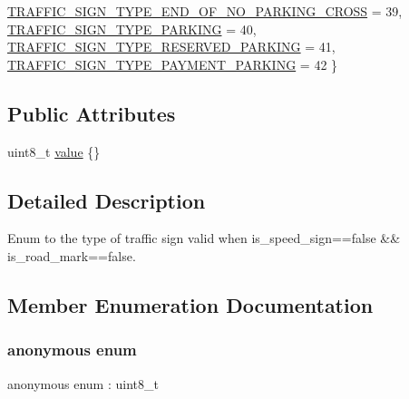 \begin{DoxyCompactItemize}
\hyperlink{structmaf__perception__interface_1_1TrafficSignTypeEnum_a8ee58c73d02876bd45300f1f742212bca35d2a4617d63066d45f0e8218b270acb}{T\+R\+A\+F\+F\+I\+C\+\_\+\+S\+I\+G\+N\+\_\+\+T\+Y\+P\+E\+\_\+\+E\+N\+D\+\_\+\+O\+F\+\_\+\+N\+O\+\_\+\+P\+A\+R\+K\+I\+N\+G\+\_\+\+C\+R\+O\+SS} = 39, 
\newline
\hyperlink{structmaf__perception__interface_1_1TrafficSignTypeEnum_a8ee58c73d02876bd45300f1f742212bca85eb2d49ec0f8629d5397db60e042f11}{T\+R\+A\+F\+F\+I\+C\+\_\+\+S\+I\+G\+N\+\_\+\+T\+Y\+P\+E\+\_\+\+P\+A\+R\+K\+I\+NG} = 40, 
\hyperlink{structmaf__perception__interface_1_1TrafficSignTypeEnum_a8ee58c73d02876bd45300f1f742212bcace675f566669e5d9c7bf0b78f60e82ae}{T\+R\+A\+F\+F\+I\+C\+\_\+\+S\+I\+G\+N\+\_\+\+T\+Y\+P\+E\+\_\+\+R\+E\+S\+E\+R\+V\+E\+D\+\_\+\+P\+A\+R\+K\+I\+NG} = 41, 
\hyperlink{structmaf__perception__interface_1_1TrafficSignTypeEnum_a8ee58c73d02876bd45300f1f742212bcafb0340ee1903f92349db315571019592}{T\+R\+A\+F\+F\+I\+C\+\_\+\+S\+I\+G\+N\+\_\+\+T\+Y\+P\+E\+\_\+\+P\+A\+Y\+M\+E\+N\+T\+\_\+\+P\+A\+R\+K\+I\+NG} = 42
 \}
\end{DoxyCompactItemize}
\subsection*{Public Attributes}
\begin{DoxyCompactItemize}
\item 
uint8\+\_\+t \hyperlink{structmaf__perception__interface_1_1TrafficSignTypeEnum_a352337147abca75fb0146194133a5a8b}{value} \{\}
\end{DoxyCompactItemize}


\subsection{Detailed Description}
Enum to the type of traffic sign  valid when is\+\_\+speed\+\_\+sign==false \&\& is\+\_\+road\+\_\+mark==false. 

\subsection{Member Enumeration Documentation}
\mbox{\label{structmaf__perception__interface_1_1TrafficSignTypeEnum_a8ee58c73d02876bd45300f1f742212bc}} 
\subsubsection{\texorpdfstring{anonymous enum}{anonymous enum}}
{\footnotesize\ttfamily anonymous enum \+: uint8\+\_\+t}


